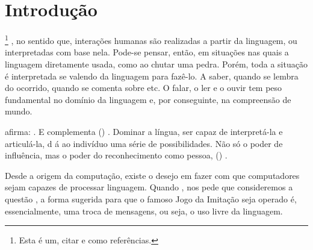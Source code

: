 \chapter{Introdução}
\label{cha:introducao}
 \cite{oliveira2019servico}
\footnote{Esta é um,  citar  e  como referências.}
, no sentido que, interações humanas são realizadas a partir da linguagem, ou interpretadas com base nela. 
Pode-se pensar, então, em situações nas quais a linguagem  diretamente usada, como ao chutar uma pedra.
Porém, toda a situação é interpretada se valendo da linguagem para fazê-lo. 
A saber, quando se lembra do ocorrido, quando se comenta sobre etc. O falar, o ler e o ouvir tem peso fundamental no domínio da linguagem e, por conseguinte, na compreensão de mundo.

 afirma: . E complementa (\textit{}) . Dominar a língua, ser capaz de interpretá-la e articulá-la, d
á ao indivíduo uma série de possibilidades. Não só o poder de influência, mas o poder do reconhecimento como pessoa, (\textit{}) .

Desde a origem da computação, existe o desejo em fazer com que computadores sejam capazes de processar linguagem.
Quando , nos pede que consideremos a questão ,
a forma sugerida para que o famoso Jogo da Imitação seja operado é, essencialmente, uma troca de mensagens, ou seja, o uso livre da linguagem. 

